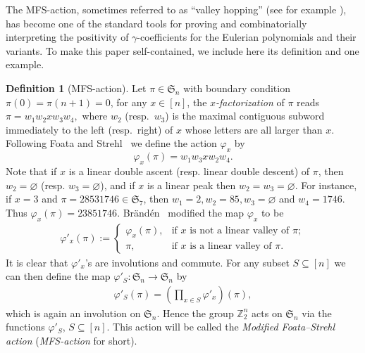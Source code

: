 \documentclass[12pt]{amsart}
\numberwithin{equation}{section}
\theoremstyle{plain}
\theoremstyle{definition}
\newtheorem{Def}[theorem]{Definition}
\newcommand{\Z}{\mathbb{Z}}
\def\SS{\mathfrak{S}}
\begin{document}
The MFS-action, sometimes referred to as ``valley hopping'' (see for example \cite[Sect.~4.1]{Ath}), has become one of the standard tools for proving and combinatorially interpreting the positivity of $\gamma$-coefficients for the Eulerian polynomials and their variants. To make this paper self-contained, we include here its definition and one example.

\begin{Def}[MFS-action]%
Let $\pi\in\SS_n$ with boundary condition $\pi(0)=\pi(n+1)=0$,
 for  any  $x\in[n]$, the {\em$x$-factorization} of $\pi$ reads $\pi=w_1 w_2x w_3 w_4,$ where $w_2$ (resp.~$w_3$) is the maximal contiguous subword immediately to the left (resp.~right) of $x$ whose letters are all larger than $x$.  Following Foata and Strehl~\cite{FSt} we define the action $\varphi_x$ by
$$
\varphi_x(\pi)=w_1 w_3x w_2 w_4.
$$
Note that if $x$ is a linear double ascent (resp. linear double descent) of $\pi$, then $w_2=\varnothing$ (resp. $w_3=\varnothing$), and if $x$ is a linear peak then
$w_2=w_3=\varnothing$.
For instance, if $x=3$ and $\pi=28531746\in\SS_7$, then $w_1=2,w_2=85,w_3=\varnothing$ and $w_4=1746$.
Thus $\varphi_x(\pi)=23851746$. Br\"and\'en~\cite{Bra08} modified the map $\varphi_x$ to be
\begin{align*}
\varphi'_x(\pi):=
\begin{cases}
\varphi_x(\pi),&\text{if $x$ is not a linear valley of $\pi$};\\
\pi,& \text{if $x$ is a linear valley of $\pi$.}
\end{cases}
\end{align*}
It is clear that $\varphi'_x$'s are involutions and commute. For any subset $S\subseteq[n]$ we can then define the map $\varphi'_S :\SS_n\to \SS_n$ by
\begin{align*}
\varphi'_S(\pi)=\left(\prod_{x\in S}\varphi'_x\right)(\pi),
\end{align*}
which is again an involution on $\SS_n$. Hence the group $\Z_2^n$ acts on $\SS_n$ via the functions $\varphi'_S$, $S\subseteq[n]$. This action will be called  the {\em Modified Foata--Strehl action} ({\em MFS-action} for short).
\end{Def}
\end{document}
